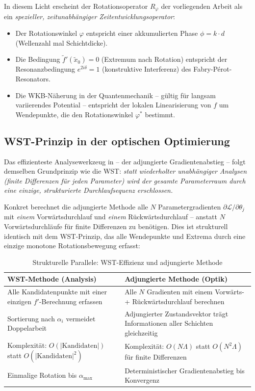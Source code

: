 ﻿\documentclass[12pt, a4paper]{article}
\theoremstyle{definition}
\begin{document}
	In diesem Licht erscheint der Rotationsoperator $R_\varphi$ der vorliegenden
	Arbeit als ein \emph{spezieller, zeitunabhängiger Zeitentwicklungsoperator}:
	\begin{itemize}
		\item Der Rotationswinkel $\varphi$ entspricht einer akkumulierten Phase
		$\phi = k \cdot d$ (Wellenzahl mal Schichtdicke).
		\item Die Bedingung $\tilde{f}'(\tilde{x}_0) = 0$ (Extremum nach Rotation)
		entspricht der Resonanzbedingung $e^{2i\delta} = 1$ (konstruktive
		Interferenz) des Fabry-Pérot-Resonators.
		\item Die WKB-Näherung in der Quantenmechanik -- gültig für langsam
		variierendes Potential -- entspricht der lokalen Linearisierung
		von $f$ um Wendepunkte, die den Rotationswinkel $\varphi^*$ bestimmt.
	\end{itemize}
	
	\subsection{WST-Prinzip in der optischen Optimierung}
	
	Das effizienteste Analysewerkzeug in \cite{oqtum} -- der adjungierte
	Gradientenabstieg -- folgt demselben Grundprinzip wie die WST:
	\emph{statt wiederholter unabhängiger Analysen (finite Differenzen für
		jeden Parameter) wird der gesamte Parameterraum durch eine einzige,
		strukturierte Durchlaufsequenz erschlossen.}
	
	Konkret berechnet die adjungierte Methode alle $N$ Parametergradienten
	$\partial\mathcal{L}/\partial\theta_j$ mit \emph{einem} Vorwärtsdurchlauf
	und \emph{einem} Rückwärtsdurchlauf -- anstatt $N$ Vorwärtsdurchläufe
	für finite Differenzen zu benötigen. Dies ist strukturell identisch mit
	dem WST-Prinzip, das alle Wendepunkte und Extrema durch eine einzige
	monotone Rotationsbewegung erfasst:
	
	\begin{table}[H]
		\centering
		\caption{Strukturelle Parallele: WST-Effizienz und adjungierte Methode}
		\renewcommand{\arraystretch}{1.4}
		\begin{tabular}{p{6.5cm} p{6.5cm}}
			\toprule
			\textbf{WST-Methode (Analysis)} & \textbf{Adjungierte Methode (Optik)} \\
			\midrule
			Alle Kandidatenpunkte mit einer einzigen $f'$-Berechnung erfassen &
			Alle $N$ Gradienten mit einem Vorwärts- + Rückwärtsdurchlauf berechnen \\[4pt]
			Sortierung nach $\alpha_i$ vermeidet Doppelarbeit &
			Adjungierter Zustandsvektor trägt Informationen aller Schichten gleichzeitig \\[4pt]
			Komplexität: $O(|\text{Kandidaten}|)$ statt $O(|\text{Kandidaten}|^2)$ &
			Komplexität: $O(N\Lambda)$ statt $O(N^2\Lambda)$ für finite Differenzen \\[4pt]
			Einmalige Rotation bis $\alpha_\mathrm{max}$ &
			Deterministischer Gradientenabstieg bis Konvergenz \\
			\bottomrule
		\end{tabular}
	\end{table}
	
\end{document}
